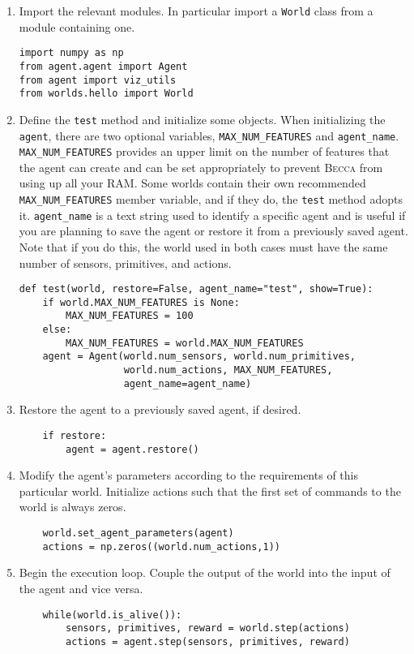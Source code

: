 \begin{enumerate}
\item
Import the relevant modules. In particular import a \texttt{World} class from a module containing one.
\begin{verbatim}
import numpy as np
from agent.agent import Agent
from agent import viz_utils
from worlds.hello import World
\end{verbatim}    

\item
Define the \texttt{test} method and initialize some objects. When initializing the \texttt{agent}, there are two optional variables, \texttt{MAX\_NUM\_FEATURES} and \texttt{agent\_name}.  \texttt{MAX\_NUM\_FEATURES} provides an upper limit on the number of features that the agent can create and can be set appropriately to prevent \textsc{Becca} from using up all your RAM. Some worlds contain their own recommended \texttt{MAX\_NUM\_FEATURES} member variable, and if they do, the \texttt{test} method adopts it. \texttt{agent\_name} is a text string used to identify a specific agent and is useful if you are planning to save the agent or restore it from a previously saved agent. Note that if you do this, the world used in both cases must have the same number of sensors, primitives, and actions.
\begin{verbatim}
def test(world, restore=False, agent_name="test", show=True):
    if world.MAX_NUM_FEATURES is None:
        MAX_NUM_FEATURES = 100
    else:
        MAX_NUM_FEATURES = world.MAX_NUM_FEATURES
    agent = Agent(world.num_sensors, world.num_primitives, 
                  world.num_actions, MAX_NUM_FEATURES, 
                  agent_name=agent_name)
\end{verbatim}

\item
Restore the agent to a previously saved agent, if desired.
\begin{verbatim}
    if restore:
        agent = agent.restore()
\end{verbatim}
    
\item
Modify the agent's parameters according to the requirements of this particular world. Initialize actions such that the first set of commands to the world is always zeros.
\begin{verbatim}
    world.set_agent_parameters(agent)
    actions = np.zeros((world.num_actions,1))
\end{verbatim}

\item
Begin the execution loop. Couple the output of the world into the input of the agent and vice versa.
\begin{verbatim}    
    while(world.is_alive()):
        sensors, primitives, reward = world.step(actions)
        actions = agent.step(sensors, primitives, reward)
\end{verbatim}


\end{enumerate}
